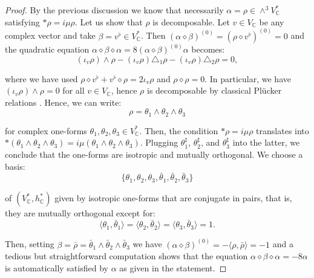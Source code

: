 \documentclass[10pt,a4paper,twoside,reqno]{amsart}
\theoremstyle{plain}
\theoremstyle{definition}
\theoremstyle{remark}
\def\C{\mathbb{C}}
\newcommand{\escal}[1]{\langle#1\rangle}
\begin{document}
\begin{proof}
By the previous discussion we know that necessarily $\alpha=\rho\in\wedge^3V^*_\C$ satisfying $*\rho=i\mu\rho$. Let us show that $\rho$ is decomposable. Let $v\in V_\C$ be any complex vector and take $\beta=v^\flat\in V^*_\C$. Then $(\alpha\diamond\beta)^{(0)}=(\rho\diamond v^\flat)^{(0)}=0$ and the quadratic equation $\alpha\diamond\beta\diamond\alpha=8(\alpha\diamond\beta)^{(0)}\alpha$ becomes: 
\begin{equation*}
(\iota_v\rho)\wedge\rho-(\iota_v\rho)\triangle_1\rho-(\iota_v\rho)\triangle_2\rho=0,  
\end{equation*}

\noindent
where we have used $\rho\diamond v^\flat+v^\flat\diamond\rho=2\iota_v\rho$ and $\rho\diamond\rho=0$. In particular, we have $(\iota_v\rho)\wedge\rho=0$ for all $v\in V_\C$, hence $\rho$ is decomposable by classical Plücker relations \cite{EM00}. Hence, we can write:
\begin{equation*}
\rho = \theta_1 \wedge \theta_2 \wedge \theta_3
\end{equation*}

\noindent
for complex one-forms $\theta_1 , \theta_2 , \theta_3 \in V^{\ast}_{\C}$. Then, the condition $\ast\rho = i\mu \rho$ translates into $\ast (\theta_1 \wedge \theta_2 \wedge \theta_3) = i \mu (\theta_1 \wedge \theta_2 \wedge \theta_3)$. Plugging $\theta_1^{\sharp}$, $ \theta_2^{\sharp}$, and $\theta_3^{\sharp}$ into the latter, we conclude that the one-forms are isotropic and mutually orthogonal. We choose a basis:
\begin{equation*}
\{\theta_1,\theta_2,\theta_3,\bar\theta_1,\bar\theta_2,\bar\theta_3\}  
\end{equation*}

\noindent
of $(V^*_\C,h^*_\C)$ given by isotropic one-forms that are conjugate in pairs, that is, they are mutually orthogonal except for:
\begin{equation*}
\escal{\theta_1,\bar\theta_1}=\escal{\theta_2,\bar\theta_2}=\escal{\theta_3,\bar\theta_3}=1.    
\end{equation*}

\noindent 
Then, setting $\beta = \bar\rho = \bar{\theta}_1 \wedge \bar{\theta}_2 \wedge \bar{\theta}_3$ we have $(\alpha\diamond\beta)^{(0)}=-\escal{\rho,\bar\rho}=-1$ and a tedious but straightforward computation shows that the equation $\alpha \diamond \beta \diamond \alpha = -8 \alpha$ is automatically satisfied by $\alpha$ as given in the statement.
\end{proof}
\end{document}
